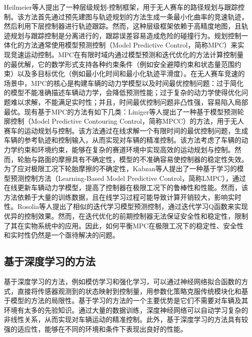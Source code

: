 Heilmeier等人提出了一种层级规划-控制框架，用于无人赛车的路径规划与跟踪控制\cite{heilmeier2020minimum}。该方法首先通过预先建图与轨迹规划的方法生成一条最小化曲率的竞速轨迹，然后利用下层控制器进行轨迹跟踪。然而，这种层级框架依赖于高精度地图，且轨迹规划与跟踪控制是分离进行的，跟踪误差容易造成危险的碰撞行为。规划控制一体化的方法通常使用模型预测控制（Model Predictive Control，简称MPC）来实现竞速运动控制。MPC在有限时域内通过模型预测和迭代优化的方法计算控制量的最优解，它的数学形式支持各种约束条件（例如安全避障约束和状态量范围约束）以及多目标优化（例如最小化时间和最小化轨迹平滑度）\cite{MOTO201303005}。在无人赛车竞速的场景中，MPC的核心是构建车辆的动力学模型以及时间最优控制问题：过于简化的模型不能准确描述车辆动力学，会降低预测性能；过于复杂的动力学使得优化问题难以求解，不能满足实时性\cite{dixit2019trajectory}；并且，时间最优控制问题非凸性强，容易陷入局部最优\cite{sedlacek2021minimum}。现有基于MPC的方法有如下几类：Liniger等人提出了一种基于模型预测轮廓控制（Model Predictive Contouring Control，简称MPCC）的方法，用于无人赛车的运动规划与控制\cite{liniger2015optimization}。该方法通过在线求解一个有限时间的最优控制问题，生成车辆的参考轨迹和控制输入，从而实现对车辆的精准控制。该方法考虑了车辆的动力学约束和环境约束，能够在复杂的赛道环境中实现高效的运动规划与控制。然而，轮胎与路面的摩擦具有不确定性，模型的不准确容易使控制器的稳定性失效。为了应对极限工况下轮胎摩擦的不确定性，Kabzan等人提出了一种基于学习的模型预测控制方法（Learning-Based Model Predictive Control，简称LMPC）\cite{kabzan2019learning}，通过在线更新车辆动力学模型，提高了控制器在极限工况下的鲁棒性和性能。然而，该方法依赖于大量的训练数据，且在线学习过程可能导致计算开销较大，影响实时性。Rosolia等人提出了相似的迭代学习模型预测控制，通过迭代学习Q函数来实现优异的控制效果\cite{rosolia2019learning}。然而，在迭代优化的前期控制器无法保证安全性和稳定性，限制了其在实物系统中的应用。因此，如何平衡MPC在极限工况下的稳定性、安全性和实时性仍然是一个亟待解决的问题。

\subsection{基于深度学习的方法}
基于深度学习的方法，例如模仿学习和强化学习，可以通过神经网络拟合函数的方式，直接将传感器观测到的状态映射到控制量，用参数化策略克服传统模块化和基于模型的方法的局限性。基于学习的方法的一个主要优势是它们不需要对车辆及其环境有太多的先验知识。通过大量的数据训练，深度神经网络可以自动学习复杂的非线性关系，从而实现对车辆运动的精准控制。此外，基于深度学习的方法具有较强的适应性，能够在不同的环境和条件下表现出良好的性能。

